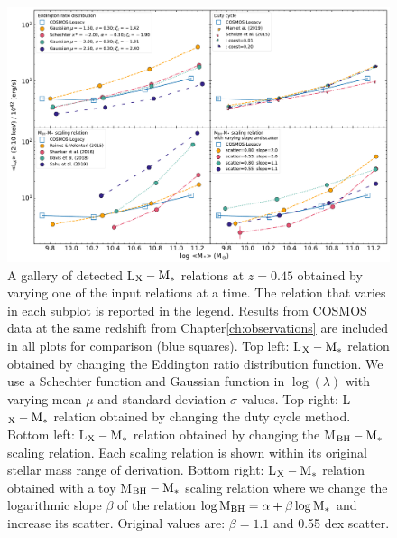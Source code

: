\begin{figure}
\begin{center}
  \includegraphics[width=\textwidth]{Figs/Chapter3/fig2_active_z0.45_Uconst02.pdf}
  \caption{A gallery of detected L$_{\rm X}-{\rm M}_*$ relations at $z=0.45$ obtained by varying one of the input relations at a time. The relation that varies in each subplot is reported in the legend. 
  Results from COSMOS data at the same redshift from Chapter\ref{ch:observations} are included in all plots for comparison (blue squares).
  Top left: L$_{\rm X}-{\rm M}_*$ relation obtained by changing the Eddington ratio distribution function. We use a Schechter function and Gaussian function in $\log(\lambda)$ with varying mean $\mu$ and standard deviation $\sigma$ values.
  Top right: L$_{\rm X}-{\rm M}_*$ relation obtained by changing the duty cycle method.
  Bottom left: L$_{\rm X}-{\rm M}_*$ relation obtained by changing the M$_{\rm BH}-{\rm M}_*$ scaling relation. Each scaling relation is shown within its original stellar mass range of derivation.
  Bottom right: L$_{\rm X}-{\rm M}_*$ relation obtained with a toy M$_{\rm BH}-{\rm M}_*$ scaling relation where we change the logarithmic slope $\beta$ of the relation $\log {\rm M}_{\rm BH} = \alpha + \beta \log {\rm M}_*$ and increase its scatter. Original \citet{2015ApJ...813...82R} values are: $\beta=1.1$ and 0.55 dex scatter.
  }
    \label{fig:LX_M}
\end{center}
\end{figure}


